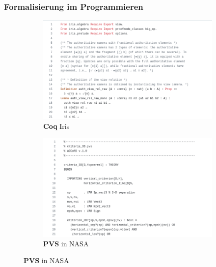 \documentclass{beamer}
\theoremstyle{definition}
\theoremstyle{remark}
\begin{document}
\begin{frame}
	\frametitle{Formalisierung im Programmieren}
	\begin{figure}
		\centering
		\begin{subfigure}[b]{0.45\textwidth}
						\includegraphics[width=\textwidth]{iris.png}
						\caption{\tiny \textbf{Coq} Iris}
		\end{subfigure}
		\hspace{0.5cm}
		\begin{subfigure}[b]{0.45\textwidth}
						\includegraphics[width=\textwidth]{pvs.png}
						\caption{\tiny \textbf{PVS} in NASA}
		\end{subfigure}


\end{figure}
\end{frame}
\end{document}
